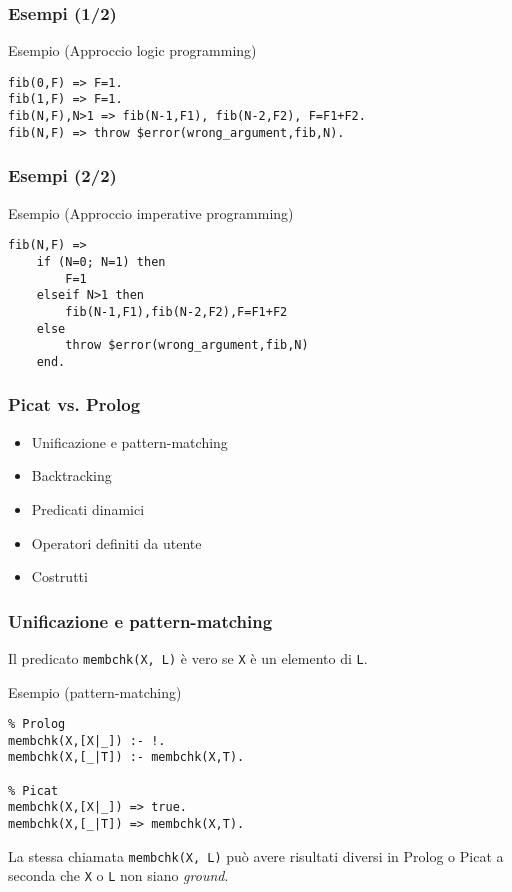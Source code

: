 \documentclass{beamer}
\begin{document}

\begin{frame}[fragile]
  \frametitle{Esempi (1/2)}
  \begin{exampleblock}{Esempio (Approccio logic programming)}
\begin{verbatim}
fib(0,F) => F=1.
fib(1,F) => F=1.
fib(N,F),N>1 => fib(N-1,F1), fib(N-2,F2), F=F1+F2.
fib(N,F) => throw $error(wrong_argument,fib,N).
\end{verbatim}
  \end{exampleblock}
\end{frame}


\begin{frame}[fragile]
  \frametitle{Esempi (2/2)}
  \begin{exampleblock}{Esempio (Approccio imperative programming)}
\begin{verbatim}
fib(N,F) =>
    if (N=0; N=1) then
        F=1
    elseif N>1 then
        fib(N-1,F1),fib(N-2,F2),F=F1+F2
    else
        throw $error(wrong_argument,fib,N)
    end.
\end{verbatim}
  \end{exampleblock}
\end{frame}


\begin{frame}[fragile]
  \frametitle{Picat vs. Prolog}
  \begin{itemize}
  	\item Unificazione e pattern-matching
  	\item Backtracking
  	\item Predicati dinamici
  	\item Operatori definiti da utente
  	\item Costrutti
  \end{itemize}

\end{frame}


\begin{frame}[fragile]
  \frametitle{Unificazione e pattern-matching}
  Il predicato \texttt{membchk(X, L)} è vero se \texttt{X} è un elemento di \texttt{L}.
  
  \begin{exampleblock}{Esempio (pattern-matching)}
\begin{verbatim}
% Prolog 
membchk(X,[X|_]) :- !.
membchk(X,[_|T]) :- membchk(X,T).

% Picat
membchk(X,[X|_]) => true.
membchk(X,[_|T]) => membchk(X,T).
\end{verbatim}
  \end{exampleblock}
 
  La stessa chiamata \texttt{membchk(X, L)} può avere risultati diversi in Prolog o Picat a seconda che \texttt{X} o \texttt{L} non siano \emph{ground}.
\end{frame}
\end{document}
